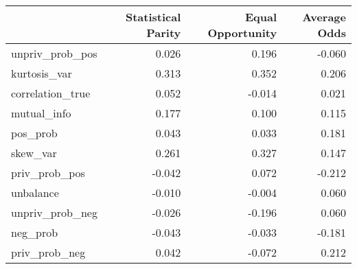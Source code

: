 \begin{tabular}{lrrr}
\toprule
 & Statistical Parity & Equal Opportunity & Average Odds \\
\midrule
unpriv_prob_pos & 0.026 & 0.196 & -0.060 \\
kurtosis_var & 0.313 & 0.352 & 0.206 \\
correlation_true & 0.052 & -0.014 & 0.021 \\
mutual_info & 0.177 & 0.100 & 0.115 \\
pos_prob & 0.043 & 0.033 & 0.181 \\
skew_var & 0.261 & 0.327 & 0.147 \\
priv_prob_pos & -0.042 & 0.072 & -0.212 \\
unbalance & -0.010 & -0.004 & 0.060 \\
unpriv_prob_neg & -0.026 & -0.196 & 0.060 \\
neg_prob & -0.043 & -0.033 & -0.181 \\
priv_prob_neg & 0.042 & -0.072 & 0.212 \\
\bottomrule
\end{tabular}
